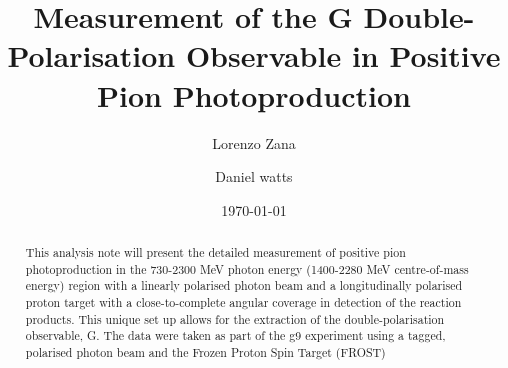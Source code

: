 \documentclass{article}
\begin{document}
\title{Measurement of the G Double-Polarisation Observable in Positive Pion Photoproduction}


\author{Lorenzo Zana}

  
\author{Daniel watts}
  



\date{\today}

\maketitle

\begin{abstract}
This analysis note will present the detailed measurement of positive pion photoproduction in the 730-2300 MeV photon energy (1400-2280 MeV centre-of-mass energy) region with a linearly polarised photon beam and a longitudinally polarised proton target with a close-to-complete angular coverage in detection of the reaction products. This unique set up allows for the extraction of the double-polarisation observable, G. The data were taken as part of the g9 experiment using a tagged, polarised photon beam and the Frozen Proton Spin Target (FROST)

%
\end{abstract}%




\tableofcontents
\end{document}
